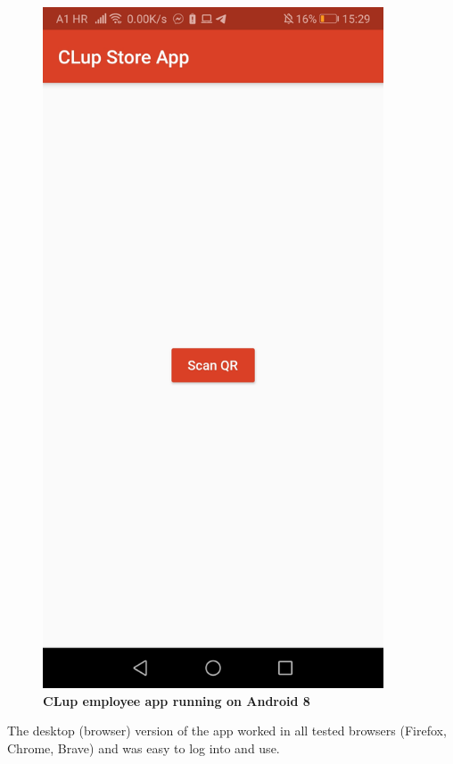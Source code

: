 \begin{figure}[!htb]
\begin{minipage}{0.45\textwidth}
\includegraphics[width=0.9\textwidth]{Images/AppClupSM}
\captionsetup{justification=centering}
\caption{\label{fig:appandroid1}\textbf{CLup employee app running on Android 8}}
\end{minipage}
\end{figure}

The desktop (browser) version of the app worked in all tested browsers (Firefox, Chrome, Brave) and was easy to log into and use. \newline

